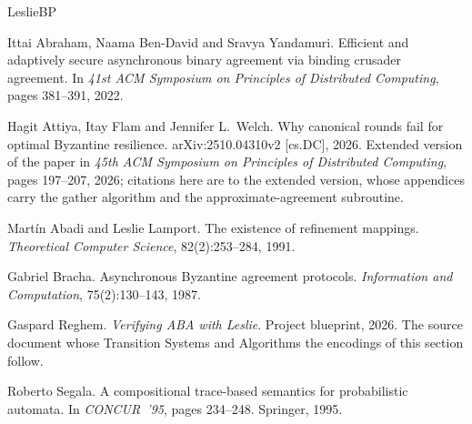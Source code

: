 \begin{thebibliography}{LeslieBP}

Ittai Abraham, Naama Ben-David and Sravya Yandamuri.
Efficient and adaptively secure asynchronous binary agreement via binding crusader agreement.
In \emph{41st ACM Symposium on Principles of Distributed Computing}, pages 381--391, 2022.

Hagit Attiya, Itay Flam and Jennifer L.\ Welch.
Why canonical rounds fail for optimal Byzantine resilience.
arXiv:2510.04310v2 [cs.DC], 2026.
Extended version of the paper in \emph{45th ACM Symposium on Principles of Distributed Computing}, pages 197--207, 2026;
citations here are to the extended version, whose appendices carry the gather algorithm and the approximate-agreement subroutine.

Mart\'in Abadi and Leslie Lamport.
The existence of refinement mappings.
\emph{Theoretical Computer Science}, 82(2):253--284, 1991.

Gabriel Bracha.
Asynchronous Byzantine agreement protocols.
\emph{Information and Computation}, 75(2):130--143, 1987.

Gaspard Reghem.
\emph{Verifying ABA with Leslie}.
Project blueprint, 2026. The source document whose Transition Systems and Algorithms the encodings of this section follow.

Roberto Segala.
A compositional trace-based semantics for probabilistic automata.
In \emph{CONCUR~'95}, pages 234--248. Springer, 1995.

\end{thebibliography}
